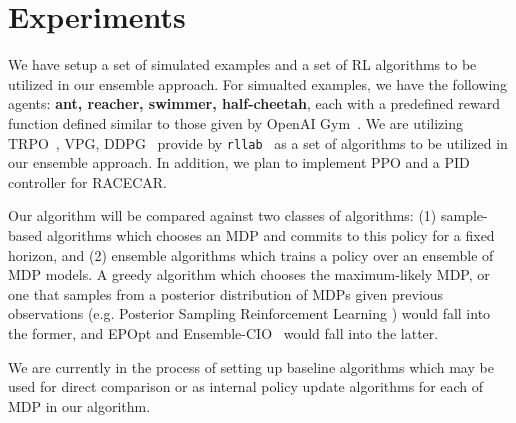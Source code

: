 \documentclass{article}
\begin{document}
\section{Experiments}

We have setup a set of simulated examples and a set of RL algorithms to be utilized in our ensemble approach. For simualted examples, we have the following agents: \textbf{ant, reacher, swimmer, half-cheetah}, each with a predefined reward function defined similar to those given by OpenAI Gym~\cite{openai}. We are utilizing TRPO~\cite{trpo}, VPG, DDPG~\cite{ddpg} provide by \texttt{rllab}~\cite{duan2016benchmarking} as a set of algorithms to be utilized in our ensemble approach. In addition, we plan to implement PPO and a PID controller for RACECAR.

Our algorithm will be compared against two classes of algorithms: (1) sample-based algorithms which chooses an MDP and commits to this policy for a fixed horizon, and (2) ensemble algorithms which trains a policy over an ensemble of MDP models. A greedy algorithm which chooses the maximum-likely MDP, or one that samples from a posterior distribution of MDPs given previous observations (e.g. Posterior Sampling Reinforcement Learning \cite{psrl}) would fall into the former, and EPOpt\cite{rajeswaran2016epopt} and Ensemble-CIO~\cite{ensemble-cio} would fall into the latter.

We are currently in the process of setting up baseline algorithms which may be used for direct comparison or as internal policy update algorithms for each of MDP in our algorithm.


\end{document}
